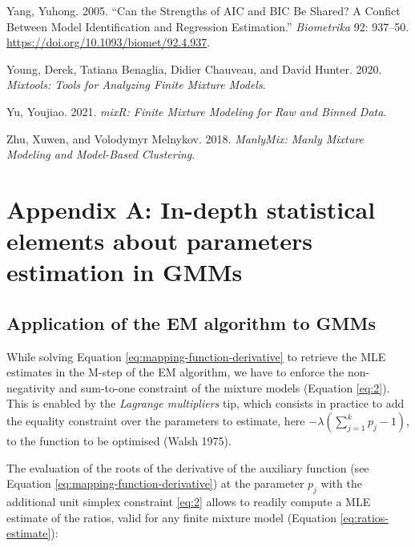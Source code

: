 \begin{CSLReferences}{1}{0}
\leavevmode{}%
Yang, Yuhong. 2005. {``Can the Strengths of {AIC} and {BIC} Be Shared? {A} Confict Between Model Identification and Regression Estimation.''} \emph{Biometrika} 92: 937--50. \url{https://doi.org/10.1093/biomet/92.4.937}.

\leavevmode{}%
Young, Derek, Tatiana Benaglia, Didier Chauveau, and David Hunter. 2020. \emph{Mixtools: Tools for Analyzing Finite Mixture Models}.

\leavevmode{}%
Yu, Youjiao. 2021. \emph{mixR: Finite Mixture Modeling for Raw and Binned Data}.

\leavevmode{}%
Zhu, Xuwen, and Volodymyr Melnykov. 2018. \emph{ManlyMix: Manly Mixture Modeling and Model-Based Clustering}.

\end{CSLReferences}

\appendix

\hypertarget{appendix-a-in-depth-statistical-elements-about-parameters-estimation-in-gmms}{%
\section{Appendix A: In-depth statistical elements about parameters estimation in GMMs}\label{appendix-a-in-depth-statistical-elements-about-parameters-estimation-in-gmms}}

\hypertarget{application-of-the-em-algorithm-to-gmms}{%
\subsection{Application of the EM algorithm to GMMs}\label{application-of-the-em-algorithm-to-gmms}}

While solving Equation \eqref{eq:mapping-function-derivative} to retrieve the MLE estimates in the M-step of the EM algorithm, we have to enforce the non-negativity and sum-to-one constraint of the mixture models (Equation
\eqref{eq:2}). This is enabled by the \emph{Lagrange multipliers} tip, which consists in practice to add the equality constraint over the parameters to estimate, here \(-\lambda (\sum_{j=1}^k p_j -1)\), to the function to be optimised (Walsh 1975).

The evaluation of the roots of the derivative of the auxiliary function
(see Equation \eqref{eq:mapping-function-derivative}) at the parameter \(p_j\) with the additional unit simplex constraint \eqref{eq:2} allows to readily compute a MLE estimate of the ratios, valid for any finite mixture model (Equation \eqref{eq:ratios-estimate}):

